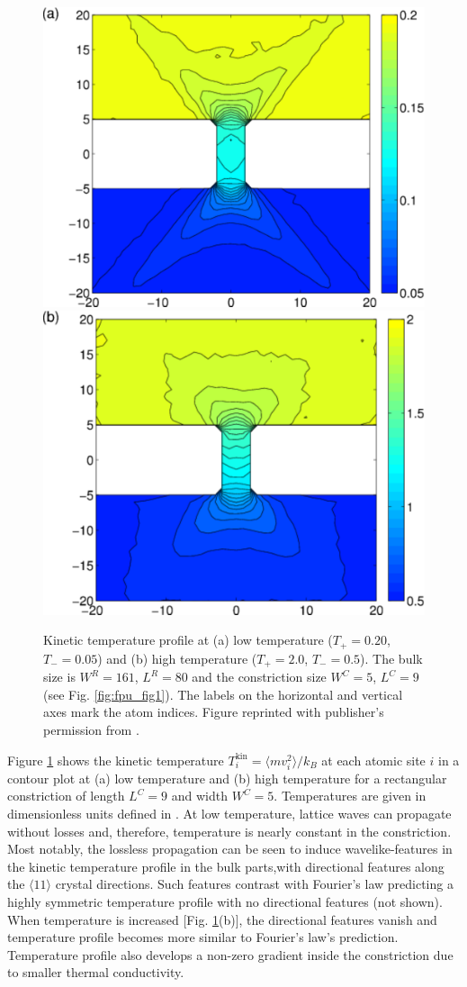 \begin{figure}
\begin{center}
 \includegraphics[width=.49\columnwidth]{pics/fpu_fig2a.pdf}
  \includegraphics[width=.49\columnwidth]{pics/fpu_fig2b.pdf}
 \caption{Kinetic temperature profile at (a) low temperature ($T_+=0.20$, $T_-=0.05$) and (b) high temperature ($T_+=2.0$, $T_-=0.5$). The bulk size is $W^R=161$, $L^R=80$ and the constriction size $W^C=5$, $L^C=9$ (see Fig. \ref{fig:fpu_fig1}). The labels on the horizontal and vertical axes mark the atom indices. Figure reprinted with publisher's permission from .}
\label{fig:fpu_fig2}
\end{center}
\end{figure}

Figure \ref{fig:fpu_fig2} shows the kinetic temperature $T_i^{\textrm{kin}}=\langle mv_i^2 \rangle/k_B$ at each atomic site $i$ in a contour plot at (a) low temperature and (b) high temperature for a rectangular constriction of length $L^C=9$ and width $W^C=5$. Temperatures are given in dimensionless units defined in . At low temperature, lattice waves can propagate without losses and, therefore, temperature is nearly constant in the constriction. Most notably, the lossless propagation can be seen to induce wavelike-features in the kinetic temperature profile in the bulk parts,with directional features along the $\langle 11 \rangle$ crystal directions. Such features contrast with Fourier's law predicting a highly symmetric temperature profile with no directional features (not shown). When temperature is increased [Fig. \ref{fig:fpu_fig2}(b)], the directional features vanish and temperature profile becomes more similar to Fourier's law's prediction. Temperature profile also develops a non-zero gradient inside the constriction due to smaller thermal conductivity.


